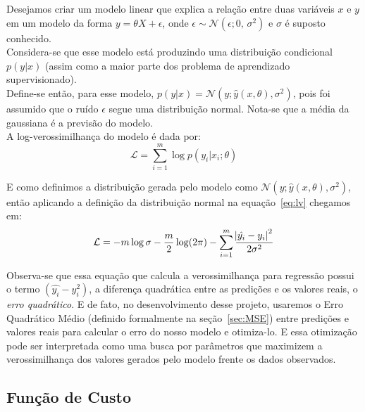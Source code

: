 Desejamos criar um modelo linear que explica a relação entre duas variáveis
$x$ e $y$ em um modelo da forma $y = \theta X + \epsilon$, onde $\epsilon
\sim \mathcal{N}(\epsilon;0,\,\sigma^2)$ e $\sigma$ é suposto conhecido.\\

Considera-se que esse modelo está produzindo uma distribuição condicional
$p(y|x)$ (assim como a maior parte dos problema de aprendizado supervisionado). \\ 

Define-se então, para esse modelo, $p(y|x) =
\mathcal{N}(y ; \hat{y}(x,\theta),\sigma^2)$, pois foi assumido que o ruído $\epsilon$
segue uma distribuição normal. Nota-se que a média da gaussiana é a previsão do
modelo. \\

A log-verossimilhança do modelo é dada por: \\

\begin{equation}
  \label{eq:lv}
\mathcal{L} =  \sum^m_{i=1}\log p(y_i | x_i ; \theta)
\end{equation}

E como definimos a distribuição gerada pelo modelo como $\mathcal{N}(y ;
\hat{y}(x,\theta),\sigma^2)$, então aplicando a definição da
distribuição normal na equação~\ref{eq:lv} chegamos em: \\


\begin{equation}
\label{eq:logver}
  \mathcal{L}= -m \log \sigma - \frac{m}{2} \log (2 \pi) - \sum^m_{i=1}
  \frac{\abs{\hat{y_i}-y_i}^2}{2 \sigma^2}
\end{equation}

Observa-se que essa equação que calcula a verossimilhança para regressão possui o termo $(\hat{y_i}-y_i^2)$, a diferença
quadrática entre as predições e os valores reais, o \textit{erro quadrático}. E
de fato, no desenvolvimento desse projeto, usaremos o Erro Quadrático Médio
(definido formalmente na seção~\ref{sec:MSE}) entre
predições e valores reais para calcular o erro do nosso modelo e otimiza-lo.  
E essa otimização pode ser interpretada como uma busca por parâmetros que
maximizem a verossimilhança dos valores gerados pelo modelo frente os dados
observados. \\ 

\subsection{Função de Custo}

